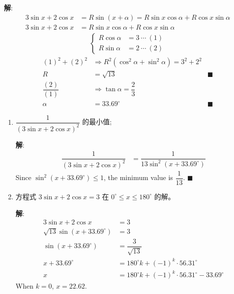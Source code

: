 \documentclass{report}
\newcommand{\sol}{\vspace{0.2cm}\textbf{解}:}
\begin{document}
\begin{enumerate}[leftmargin=*]
        \sol{}
        \begin{align*}
            3 \sin x+2 \cos x &= R \sin (x+\alpha) = R\sin x\cos\alpha + R\cos x\sin\alpha\\
            3\sin x + 2\cos x &= R\sin x\cos\alpha + R\cos x\sin\alpha
        \end{align*}
        \begin{align*}
            \begin{cases}
                R\cos\alpha &= 3\ \cdots\ (1)\\
                R\sin\alpha &= 2\ \cdots\ (2)
            \end{cases}
        \end{align*}
        \begin{align*}
            (1)^2 + (2)^2 &\Rightarrow R^2(\cos^2\alpha + \sin^2\alpha) = 3^2 + 2^2\\
            R &= \sqrt{13} &\blacksquare\\
            \dfrac{(2)}{(1)} &\Rightarrow \tan\alpha = \dfrac{2}{3}\\
            \alpha &= 33.69^{\circ} &\blacksquare
        \end{align*}
        
        \begin{enumerate}
        \item $\dfrac{1}{(3 \sin x+2 \cos x)^2}$ 的最小值;
        
        \sol{}
        \begin{align*}
            \dfrac{1}{(3 \sin x+2 \cos x)^2} &= \dfrac{1}{13\sin^2(x + 33.69^{\circ})}
        \end{align*}
        Since $\sin^2(x + 33.69^{\circ}) \leq 1$, the minimum value is $\dfrac{1}{13}$. \hfill $\blacksquare$
        
        \item 方程式 $3 \sin x+2 \cos x=3$ 在 $0^{\circ} \leq x \leq 180^{\circ}$ 的解。
        
        \sol{}
        \begin{align*}
            3 \sin x+2 \cos x &= 3\\
            \sqrt{13}\sin(x + 33.69^{\circ}) &= 3\\
            \sin(x + 33.69^{\circ}) &= \dfrac{3}{\sqrt{13}}\\
            x + 33.69^{\circ} &= 180^{\circ}k + (-1)^k \cdot 56.31^{\circ}\\
            x &= 180^{\circ}k + (-1)^k \cdot 56.31^{\circ} - 33.69^{\circ}
        \end{align*}
        When $k = 0$, $x = 22.62$.


\end{enumerate}
\end{enumerate}
\end{document}

